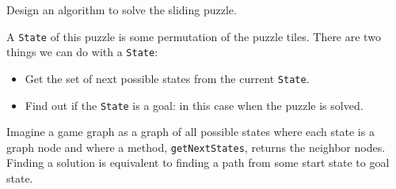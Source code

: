 Design an algorithm to solve the sliding puzzle.

A \texttt{State} of this puzzle is some permutation of the puzzle tiles. There are two things we can do with a \texttt{State}:
\begin{itemize}
\item Get the set of next possible states from the current \texttt{State}.
\item Find out if the \texttt{State} is a goal: in this case when the puzzle is solved.
\end{itemize}

Imagine a game graph as a graph of all possible states where each state is a graph node and where a method, \texttt{getNextStates}, returns the neighbor nodes.
Finding a solution is equivalent to finding a path from some start state to goal state.


